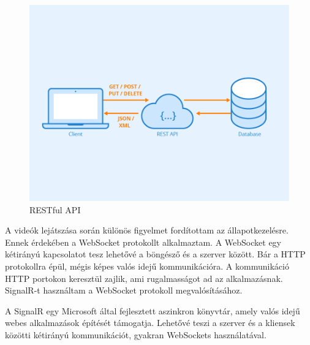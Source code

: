 \begin{figure}[H]
    \centering
    \includegraphics[width=14.0truecm]{images/Rest-API.png}
    \caption[RESTful API]{RESTful API \cite{restfulapi}}
    \label{fig:restfulapi}
\end{figure}

A videók lejátszása során különös figyelmet fordítottam
az állapotkezelésre. Ennek érdekében a WebSocket
protokollt alkalmaztam. A WebSocket egy kétirányú
kapcsolatot tesz lehetővé a böngésző és a szerver között.
Bár a HTTP protokollra épül, mégis képes valós idejű
kommunikációra. A kommunikáció HTTP portokon keresztül zajlik,
ami rugalmasságot ad az alkalmazásnak.
SignalR-t használtam a WebSocket protokoll megvalósításához.

A SignalR egy Microsoft által fejlesztett aszinkron könyvtár,
amely valós idejű webes alkalmazások építését támogatja.
Lehetővé teszi a szerver és a kliensek közötti kétirányú
kommunikációt, gyakran WebSockets használatával.

